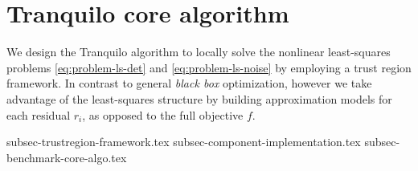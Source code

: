 \section{Tranquilo core algorithm}
\label{sec:tranquilo-core}
We design the Tranquilo algorithm to locally solve the nonlinear least-squares problems \ref{eq:problem-ls-det} and \ref{eq:problem-ls-noise} by employing a trust region framework. In contrast to general \textit{black box} optimization, however we take advantage of the least-squares structure by building approximation models for each residual $r_i$, as opposed to the full objective $f$.

{subsec-trustregion-framework.tex}
{subsec-component-implementation.tex}
{subsec-benchmark-core-algo.tex}
